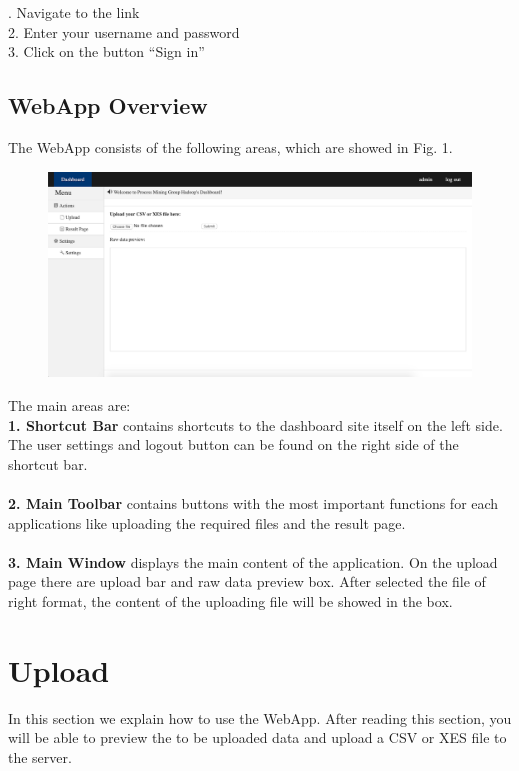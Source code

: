 \documentclass[runningheads]{llncs}
\begin{document}
. Navigate to the link\\
2. Enter your username and password\\
3. Click on the button “Sign in”\\

\subsection{WebApp Overview}
The WebApp consists of the following areas, which are showed in Fig. 1.\\

\begin{figure}[h]	
	\centering
	\includegraphics[scale=0.24]{dashboard.png}
	\caption{}
	\label{fig:label}
\end{figure}
\noindent
The main areas are:\\

\noindent
\textbf{1. Shortcut Bar} contains shortcuts to the dashboard site itself on the left side. The user settings and logout button can be found on the right side of the shortcut bar.\\\\
\noindent
\textbf{2. Main Toolbar} contains buttons with the most important functions for each applications like uploading the required files and the result page.\\\\
\noindent
\textbf{3. Main Window} displays the main content of the application. On the upload page there are upload bar and raw data preview box. After selected the file of right format, the content of the uploading file will be showed in the box.

\section{Upload}

In this section we explain how to use the WebApp. After reading this section, you will be able to preview the to be uploaded data and upload a CSV or XES file to the server.
\end{document}
